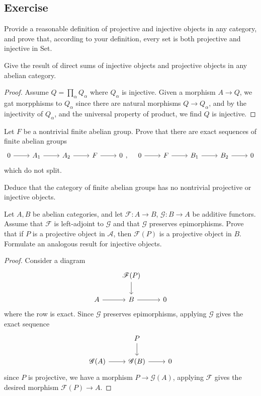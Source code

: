 \subsection{Exercise}
\begin{exercise}
Provide a reasonable definition of projective and injective objects in any category, and prove that, according to your definition, every set is both projective and injective in Set.
\end{exercise}
\begin{exercise}
Give the result of direct sums of injective objects and projective objects in any abelian category.
\end{exercise}
\begin{proof}
Assume $Q=\prod_{\alpha}Q_\alpha$ where $Q_\alpha$ is injective. Given a morphism $A\to Q$, we gat morpphisms to $Q_\alpha$ since there are natural morphisms $Q\to Q_\alpha$, and by the injectivity of $Q_\alpha$, and the universal property of product, we find $Q$ is injective.
\end{proof}
\begin{exercise}
Let $F$ be a nontrivial finite abelian group. Prove that there are exact sequences of finite abelian groups
\[\begin{tikzcd}
0\ar[r]&A_1\ar[r]&A_2\ar[r]&F\ar[r]&0
\end{tikzcd},\quad\begin{tikzcd}
0\ar[r]&F\ar[r]&B_1\ar[r]&B_2\ar[r]&0
\end{tikzcd}\]
which do not split.\par
Deduce that the category of finite abelian groups has no nontrivial projective or injective objects.
\end{exercise}
\begin{exercise}
Let $A,B$ be abelian categories, and let $\mathscr{F}:A\to B$, $\mathscr{G}:B\to A$ be additive functors. Assume that $\mathscr{F}$ is left-adjoint to $\mathscr{G}$ and that $\mathscr{G}$ preserves epimorphisms. Prove that if $P$ is a projective object in $\mathcal{A}$, then $\mathscr{F}(P)$ is a projective object in $B$. Formulate an analogous result for injective objects.
\end{exercise}
\begin{proof}
Consider a diagram 
\[\begin{tikzcd}
&\mathscr{F}(P)\ar[d]&\\
A\ar[r]&B\ar[r]&0
\end{tikzcd}\]
where the row is exact. Since $\mathscr{G}$ preserves epimorphisms, applying $\mathscr{G}$ gives the exact sequence
\[\begin{tikzcd}
&P\ar[d]&\\
\mathscr{G}(A)\ar[r]&\mathscr{G}(B)\ar[r]&0
\end{tikzcd}\]
since $P$ is projective, we have a morphism $P\to\mathscr{G}(A)$, applying $\mathscr{F}$ gives the desired morphism $\mathscr{F}(P)\to A$.
\end{proof}

